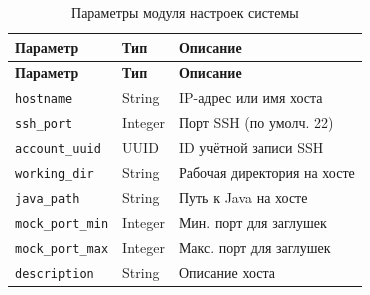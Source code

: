 
\begin{xltabular}{\textwidth}{|l|l|X|}
\caption{Параметры модуля настроек системы} \label{tab:host-params} \\
\hline
\textbf{Параметр} & \textbf{Тип} & \textbf{Описание} \\ \hline
\endfirsthead
\hline
\textbf{Параметр} & \textbf{Тип} & \textbf{Описание} \\ \hline
\endhead

\texttt{hostname} & String & IP-адрес или имя хоста \\ \hline
\texttt{ssh\_port} & Integer & Порт SSH (по умолч. 22) \\ \hline
\texttt{account\_uuid} & UUID & ID учётной записи SSH \\ \hline
\texttt{working\_dir} & String & Рабочая директория на хосте \\ \hline
\texttt{java\_path} & String & Путь к Java на хосте \\ \hline
\texttt{mock\_port\_min} & Integer & Мин. порт для заглушек \\ \hline
\texttt{mock\_port\_max} & Integer & Макс. порт для заглушек \\ \hline
\texttt{description} & String & Описание хоста \\ \hline
\end{xltabular}

